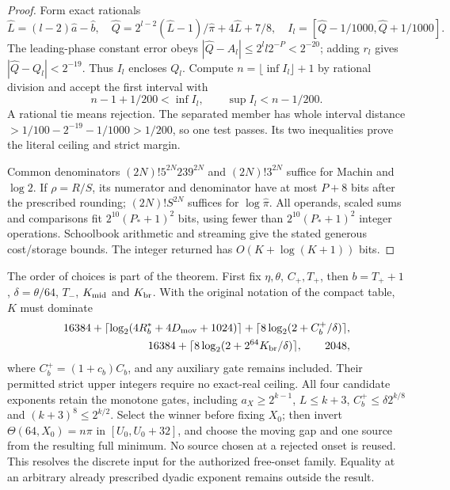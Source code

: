 \begin{proof}
Form exact rationals
\[
 \widehat L=(l-2)\widehat a-\widehat b,\quad
 \widehat Q=2^{l-2}(\widehat L-1)/\widehat\pi+4\widehat L+7/8,
 \quad I_l=[\widehat Q-1/1000,\widehat Q+1/1000].
\]
The leading-phase constant error obeys
$|\widehat Q-A_l|\le2^ll2^{-P}<2^{-20}$; adding $r_l$ gives
$|\widehat Q-Q_l|<2^{-19}$. Thus $I_l$ encloses $Q_l$.
Compute $n=\lfloor\inf I_l\rfloor+1$ by rational division and
accept the first interval with
\[
 n-1+1/200<\inf I_l,\qquad \sup I_l<n-1/200.
\]
A rational tie means rejection. The separated member has whole
interval distance $>1/100-2^{-19}-1/1000>1/200$, so one test passes.
Its two inequalities prove the literal ceiling and strict margin.

Common denominators $(2N)!5^{2N}239^{2N}$ and $(2N)!3^{2N}$
suffice for Machin and $\log2$. If $\rho=R/S$, its numerator and
denominator have at most $P+8$ bits after the prescribed rounding;
$(2N)!S^{2N}$ suffices for $\log\widehat\pi$. All operands,
scaled sums and comparisons fit $2^{10}(P_*+1)^2$ bits, using
fewer than $2^{10}(P_*+1)^2$ integer operations. Schoolbook
arithmetic and streaming give the stated generous cost/storage bounds.
The integer returned has $O(K+\log(K+1))$ bits.
\end{proof}

The order of choices is part of the theorem. First fix $\eta,\theta$,
$C_+,T_+$, then $b=T_++1$, $\delta=\theta/64$, $T_-$,
$K_{\rm mid}$ and $K_{\rm br}$. With the original notation of the
compact table, $K$ must dominate
\begin{align*}
 16384+\lceil\log_2(4R_b^*+4D_{\rm mov}+1024)\rceil
           +\lceil8\log_2(2+C_b^+/\delta)\rceil,\\
 16384+\lceil8\log_2(2+2^{64}K_{\rm br}/\delta)\rceil,
 \qquad2048,
\end{align*}
where $C_b^+=(1+c_b)C_b$, and any auxiliary gate remains included.
Their permitted strict upper integers require no exact-real ceiling.
All four candidate exponents retain the monotone gates, including
$a_X\ge2^{k-1}$, $L\le k+3$, $C_b^+\le\delta2^{k/8}$ and
$(k+3)^8\le2^{k/2}$. Select the winner before fixing $X_0$; then
invert $\Theta(64,X_0)=n\pi$ in $[U_0,U_0+32]$, and choose
the moving gap and one source from the resulting full minimum.
No source chosen at a rejected onset is reused. This resolves the
discrete input for the authorized free-onset family. Equality at an
arbitrary already prescribed dyadic exponent remains outside the result.

